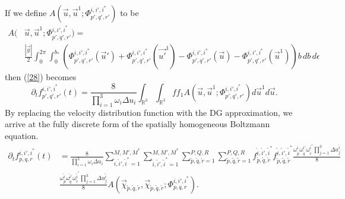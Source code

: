 %
If we define $A(\vec{u},\vec{u}^1;\Phi^{i,i',i^*}_{p',q',r'})$ to be
%
\begin{align*}
A(&\vec{u},\vec{u}^1;\Phi^{i,i',i^*}_{p',q',r'}) =\\
& \frac{|\vec{g}|}{2} \int_0^{2 \pi} \int_0^{b_*} \left( \Phi^{i,i',i^*}_{p',q',r'}(\vec{u}') + \Phi^{i,i',i^*}_{p',q',r'}(\vec{u'}^1) - \Phi^{i,i',i^*}_{p',q',r'}(\vec{u}) - \Phi^{i,i',i^*}_{p',q',r'}(\vec{u}^1) \right) b \, db \, d\epsilon
\end{align*}
%
then (\ref{28}) becomes
%
\begin{equation*}
\label{finalForm}
\partial_t f_{p',q',r'}^{i,i',i^*}(t) = \frac{8}{\prod_{i=1}^3 \omega_i \Delta u_i} \int_{\mathbb{R}^3} \int_{\mathbb{R}^3} f f_1 A(\vec{u},\vec{u}^1;\Phi^{i,i',i^*}_{p',q',r'}) d\vec{u}^1 d\vec{u}.
\end{equation*}
%
By replacing the velocity distribution function with the DG approximation, we arrive at the fully discrete form of the spatially homogeneous Boltzmann equation.
%
\begin{align*}
\partial_t f_{p,q,r}^{i,i',i^*}(t) &= \frac{8}{\prod_{i=1}^3 \omega_i \Delta u_i} \sum_{\mathring{i},\mathring{i}',\mathring{i}^*=1}^{M,M',M^*} \sum_{\tilde{i},\tilde{i}',\tilde{i}^*=1}^{M,M',M^*} \sum_{\mathring{p},\mathring{q},\mathring{r}=1}^{P,Q,R} \sum_{\tilde{p},\tilde{q},\tilde{r}=1}^{P,Q,R} f_{\mathring{p},\mathring{q},\mathring{r}}^{\mathring{i},\mathring{i}',\mathring{i}^*} f_{\tilde{p},\tilde{q},\tilde{r}}^{\tilde{i},\tilde{i}',\tilde{i}^*} \frac{\omega_{\mathring{p}}^i \omega_{\mathring{q}}^{i'} \omega_{\mathring{r}}^{i^*} \prod_{j=1}^3 \Delta u_{j}^{\mathring{i}}}{8}\\
&\frac{ \omega_{\tilde{p}}^{\tilde{i}} \omega_{\tilde{q}}^{\tilde{i}'} \omega_{\tilde{r}}^{\tilde{i}^*} \prod_{j=1}^3 \Delta u_{j}^{\tilde{i}}}{8} A(\vec{\chi}_{\mathring{p},\mathring{q},\mathring{r}},\vec{\chi}_{\tilde{p},\tilde{q},\tilde{r}};\Phi_{p,q,r}^{i,i',i^*}).
\end{align*}
%

